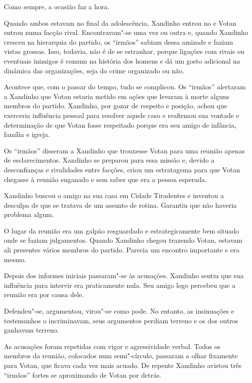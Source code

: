 Como sempre, a ocasião faz a hora.

Quando ambos estavam no final da adolescência, Xandinho entrou no  e
Votan entrou numa facção rival. Encontravam"-se uma vez ou outra e,
quando Xandinho cresceu na hierarquia do partido, os ``irmãos'' sabiam
dessa amizade e faziam vistas grossas. Isso, todavia, não é de se
estranhar, porque ligações com rivais ou eventuais inimigos é comum na
história dos homens e dá um gosto adicional na dinâmica das
organizações, seja do crime organizado ou não.

Acontece que, com o passar do tempo, tudo se complicou. Os ``irmãos''
alertaram a Xandinho que Votan estaria metido em ações que levaram à
morte alguns membros do partido. Xandinho, por gozar de respeito e
posição, achou que exerceria influência pessoal para resolver aquele
caso e reafirmou sua vontade e determinação de que Votan fosse
respeitado porque era seu amigo de infância, família e igreja.

Os ``irmãos'' disseram a Xandinho que trouxesse Votan para uma reunião
apenas de esclarecimentos. Xandinho se preparou para essa missão e,
devido a desconfianças e rivalidades entre facções, criou um estratagema
para que Votan chegasse à reunião enganado e sem saber que era a pessoa
esperada.

Xandinho buscou o amigo na sua casa em Cidade Tiradentes e inventou a
desculpa de que se tratava de um assunto de rotina. Garantiu que não
haveria problema algum.

\asterisc{}

O lugar da reunião era um galpão resguardado e estrategicamente bem
situado onde se faziam julgamentos. Quando Xandinho chegou trazendo
Votan, estavam ali presentes vários membros do partido. Parecia um
encontro importante e era mesmo.

Depois dos informes iniciais passaram"-se às acusações. Xandinho sentiu
que sua influência para intervir era praticamente nula. Seu amigo logo
percebeu que a reunião era por causa dele.

Defendeu"-se, argumentou, virou"-se como pode. No entanto, as insinuações
e testemunhos o incriminavam, seus argumentos perdiam terreno e os dos
outros ganhavam terreno.

As acusações foram repetidas com vigor e agressividade verbal. Todos os
membros da reunião, colocados num semi"-círculo, passaram a olhar
fixamente para Votan, que ficava cada vez mais acuado. De repente
Xandinho avistou três ``irmãos'' fortes se aproximando de Votan por
detrás.

